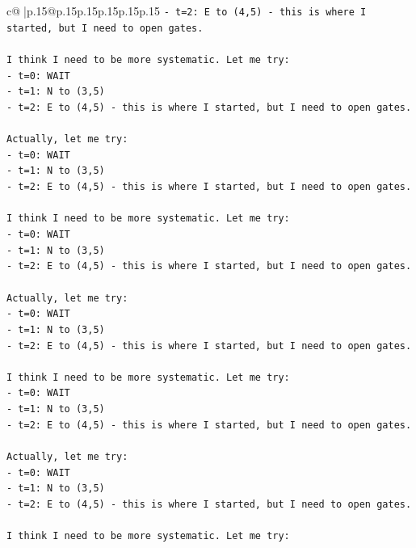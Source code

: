 \documentclass{article}
\begin{document}
{\begin{supertabular}{c@{$\;$}|p{.15\linewidth}@{}p{.15\linewidth}p{.15\linewidth}p{.15\linewidth}p{.15\linewidth}p{.15\linewidth}}
{{{\texttt{{-} t=2: E to (4,5) {-} this is where I started, but I need to open gates.} \\
\\ 
\texttt{I think I need to be more systematic. Let me try:} \\
\texttt{{-} t=0: WAIT} \\
\texttt{{-} t=1: N to (3,5)} \\
\texttt{{-} t=2: E to (4,5) {-} this is where I started, but I need to open gates.} \\
\\ 
\texttt{Actually, let me try:} \\
\texttt{{-} t=0: WAIT} \\
\texttt{{-} t=1: N to (3,5)} \\
\texttt{{-} t=2: E to (4,5) {-} this is where I started, but I need to open gates.} \\
\\ 
\texttt{I think I need to be more systematic. Let me try:} \\
\texttt{{-} t=0: WAIT} \\
\texttt{{-} t=1: N to (3,5)} \\
\texttt{{-} t=2: E to (4,5) {-} this is where I started, but I need to open gates.} \\
\\ 
\texttt{Actually, let me try:} \\
\texttt{{-} t=0: WAIT} \\
\texttt{{-} t=1: N to (3,5)} \\
\texttt{{-} t=2: E to (4,5) {-} this is where I started, but I need to open gates.} \\
\\ 
\texttt{I think I need to be more systematic. Let me try:} \\
\texttt{{-} t=0: WAIT} \\
\texttt{{-} t=1: N to (3,5)} \\
\texttt{{-} t=2: E to (4,5) {-} this is where I started, but I need to open gates.} \\
\\ 
\texttt{Actually, let me try:} \\
\texttt{{-} t=0: WAIT} \\
\texttt{{-} t=1: N to (3,5)} \\
\texttt{{-} t=2: E to (4,5) {-} this is where I started, but I need to open gates.} \\
\\ 
\texttt{I think I need to be more systematic. Let me try:} \\
}}}
\end{supertabular}}
\end{document}
